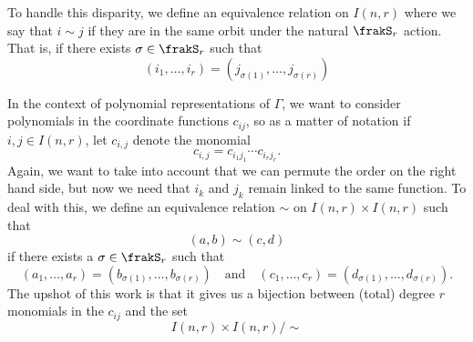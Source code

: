 \documentclass[12pt]{article}
\begin{document}
To handle this disparity, we define an equivalence relation on $I(n,r)$ where we say that $i\sim j$ if they are in the 
same orbit under the natural $\frakS_r$ action. That is, if there exists $\sigma\in\frakS_r$ such that
\[(i_1,\dots,i_r)=(j_{\sigma(1)},\dots,j_{\sigma(r)})\]

In the context of polynomial representations of $\Gamma$, we want to consider polynomials in the coordinate functions $c_{ij}$,
so as a matter of notation if $i,j\in I(n,r)$, let $c_{i,j}$ denote the monomial 
\[c_{i,j}=c_{i_1j_1}\cdots c_{i_rj_r}.\]
Again, we want to take into account that we can permute the order on the right hand side, but now we need that $i_k$ and $j_k$ 
remain linked to the same function. To deal with this, we define an equivalence relation $\sim$ on $I(n,r)\times I(n,r)$ such that 
\[(a,b)\sim (c,d)\]
if there exists a $\sigma\in\frakS_r$ such that 
\[(a_1,\dots,a_r)=(b_{\sigma(1)},\dots,b_{\sigma(r)})\quad\text{and}\quad(c_1,\dots,c_r)=(d_{\sigma(1)},\dots,d_{\sigma(r)}).\]
The upshot of this work is that it gives us a bijection between (total) degree $r$ monomials in the $c_{ij}$ and the set
\[I(n,r)\times I(n,r)/\sim\]
\end{document}
